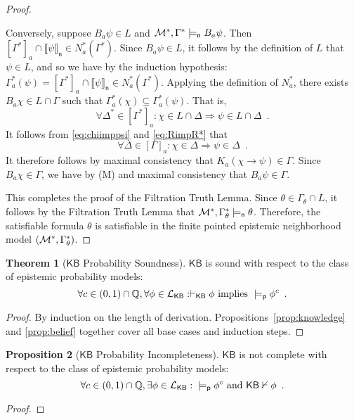 \documentclass[12pt]{article}
\theoremstyle{definition}
\newtheorem{theorem}{Theorem}[section]
\newtheorem{proposition}[theorem]{Proposition}
\newcommand{\Rat}{\mathbb{Q}}  %
\newcommand{\M}{{\cal M}}      %
\newcommand{\Lang}{{\cal L}}   %
\newcommand{\KB}{{\mathsf{KB}}}                     %
\newcommand{\modelsn}{\models_{\mathsf{n}}}                  %
\newcommand{\semn}[1]{\llbracket{#1}\rrbracket_{\mathsf{n}}} %
\newcommand{\modelsp}{\models_{\mathsf{p}}}                  %
\begin{document}
\begin{proof}
\begin{itemize}
    Conversely, suppose $B_a\psi\in L$ and $\M^*,\Gamma^*\modelsn
    B_a\psi$.  Then $[\Gamma^*]_a\cap\semn{\psi}\in N^*_a(\Gamma^*)$.
    Since $B_a\psi\in L$, it follows by the definition of $L$ that
    $\psi\in L$, and so we have by the induction hypothesis:
    $\Gamma_a^*(\psi)=[\Gamma^*]_a\cap\semn{\psi}\in N^*_a(\Gamma^*)$.
    Applying the definition of $N^*_a$, there exists $B_a\chi\in
    L\cap\Gamma$ such that
    $\Gamma^*_a(\chi)\subseteq\Gamma^*_a(\psi)$.  That is,
    \begin{equation}
      \forall\Delta^*\in[\Gamma^*]_a: \chi\in L\cap\Delta\Rightarrow
      \psi\in L\cap\Delta\enspace.
      \label{eq:chiimppsi}
    \end{equation}
    It follows from \eqref{eq:chiimppsi} and \eqref{eq:RimpR*} that
    \[
    \forall\Delta\in[\Gamma]_a:\chi\in\Delta\Rightarrow\psi\in\Delta\enspace.
    \]
    It therefore follows by maximal consistency that
    $K_a(\chi\to\psi)\in\Gamma$.  Since $B_a\chi\in\Gamma$, we have by
    (M) and maximal consistency that $B_a\psi\in\Gamma$.
  \end{itemize}
  This completes the proof of the Filtration Truth Lemma.  Since
  $\theta\in\Gamma_\theta\cap L$, it follows by the Filtration Truth
  Lemma that $\M^*,\Gamma_\theta^*\modelsn\theta$.  Therefore, the
  satisfiable formula $\theta$ is satisfiable in the finite pointed
  epistemic neighborhood model $(\M^*,\Gamma^*_\theta)$.
\end{proof}

\begin{theorem}[$\KB$ Probability Soundness]
  $\KB$ is sound with respect to the class of epistemic probability
  models:
  \[
  \forall c\in(0,1)\cap\Rat,\forall\phi\in\Lang_\KB: \vdash_\KB\phi
  \text{ implies } {}\modelsp\phi^c \enspace.
  \]
\end{theorem}
\begin{proof}
  By induction on the length of
  derivation. Propositions~\ref{prop:knowledge} and \ref{prop:belief}
  together cover all base cases and induction steps.
\end{proof}

\begin{proposition}[$\KB$ Probability Incompleteness]
  $\KB$ is not complete with respect to the class of epistemic
  probability models:
  \[
  \forall c\in(0,1)\cap\Rat,\exists\phi\in\Lang_\KB: {}\modelsp\phi^c
  \text{ and } \KB\nvdash\phi \enspace.
  \]
\end{proposition}
\begin{proof}
\end{proof}
\end{document}
